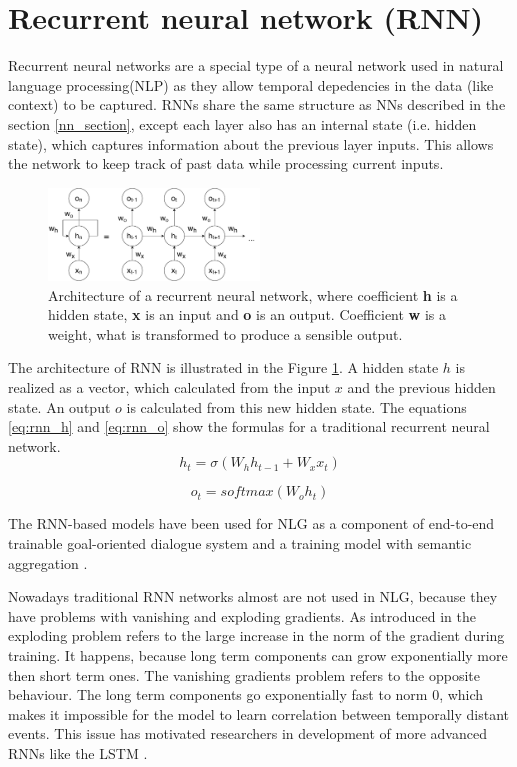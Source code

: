 \section{Recurrent neural network (RNN)} \label{rnn_section}
Recurrent neural networks are a special type of a neural network used in natural language processing(NLP) as they allow temporal depedencies in the data (like context) to be captured. RNNs share the same structure as NNs described in the section \ref{nn_section}, except each layer also has an internal state (i.e. hidden state), which captures information about the previous layer inputs. This allows the network to keep track of past data while processing current inputs.

\begin{figure}[hbt]
  \centering
  \includegraphics[width=0.5\textwidth]{figures/rnn.pdf}
  \caption{Architecture of a recurrent neural network, where coefficient \textbf{h} is a hidden state, \textbf{x} is an input and \textbf{o} is an output. Coefficient \textbf{w} is a weight, what is transformed to produce a sensible output.}
  \label{rnn}
\end{figure}


The architecture of RNN is illustrated in the Figure \ref{rnn}. A hidden state $h$ is realized as a vector, which calculated from the input $x$ and the previous hidden state. An output $o$ is calculated from this new hidden state. 
The equations \ref{eq:rnn_h} and \ref{eq:rnn_o} show the formulas for a traditional recurrent neural network.
\begin{equation} \label{eq:rnn_h}
h_t = \sigma(W_hh_{t-1} + W_xx_t)
\end{equation}

\begin{equation} \label{eq:rnn_o}
o_t = softmax(W_oh_t)
\end{equation}

The RNN-based models have been used for NLG as a component of end-to-end trainable goal-oriented dialogue system \cite{network_nlg} and a training model with semantic aggregation \cite{rnn_nlg}. 

Nowadays traditional RNN networks almost are not used in NLG, because they have problems with vanishing and exploding gradients. As introduced in \cite{bengio1994learning} the exploding problem refers to the large increase in the norm of the gradient during training. It happens, because long term components can grow exponentially more then short term ones. The vanishing gradients problem refers to the opposite behaviour. The long term components go exponentially fast to norm 0, which makes it impossible for the model to learn correlation between temporally distant events. This issue has motivated researchers in development of more advanced RNNs like the LSTM \cite{hochreiter1997long}.

